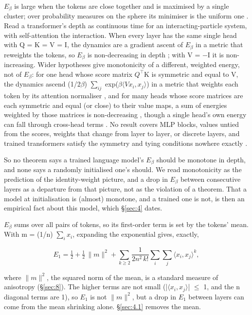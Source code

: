 \documentclass[11pt]{article}
\begin{document}
$E_\beta $ is large when the tokens are close together and is maximised by a single cluster; over probability measures on the sphere its minimiser is the uniform one \citep[Prop. 3.4]{geshkovski2023}. Read a transformer's depth as continuous time for an interacting-particle system, with self-attention the interaction. When every layer has the same single head with Q = K = V = I, the dynamics are a gradient ascent of $E_\beta $ in a metric that reweights the tokens, so $E_\beta $ is non-decreasing in depth \citep[\S{}3.2]{geshkovski2023}; with V = $-$I it is non-increasing. Wider hypotheses give monotonicity of a different, weighted energy, not of $E_\beta $: for one head whose score matrix $Q^{\top}$K is symmetric and equal to V, the dynamics ascend (1/2$\beta $) $\sum _{ij}$ exp($\beta \langle Vx_{i}, x_{j}\rangle $) in a metric that weights each token by its attention normaliser \citep[\S{}3.4.1]{geshkovski2023}, and for many heads whose score matrices are each symmetric and equal (or close) to their value maps, a sum of energies weighted by those matrices is non-decreasing \citep[Theorems 11--12]{pendharkar2026}, though a single head's own energy can fall through cross-head terms \citep[Theorem 17]{pendharkar2026}. No result covers MLP blocks, values untied from the scores, weights that change from layer to layer, or discrete layers, and trained transformers satisfy the symmetry and tying conditions nowhere exactly \citep[\S{}10]{pendharkar2026}.

So no theorem says a trained language model's $E_\beta $ should be monotone in depth, and none says a randomly initialised one's should. We read monotonicity as the prediction of the identity-weight picture, and a drop in $E_\beta $ between consecutive layers as a departure from that picture, not as the violation of a theorem. That a model at initialisation is (almost) monotone, and a trained one is not, is then an empirical fact about this model, which \S\ref{sec:4} dates.

$E_\beta $ sums over all pairs of tokens, so its first-order term is set by the tokens' mean. With m = (1/n) $\sum _{i} x_{i}$, expanding the exponential gives, exactly,

\begin{equation}
E_1 = \tfrac12 + \tfrac12\,\|m\|^2 + \sum_{k\ge 2}\frac{1}{2n^2\,k!}\sum_i\sum_j \langle x_i, x_j\rangle^k,
\end{equation}

where $\|m\|^{2}$, the squared norm of the mean, is a standard measure of anisotropy (\S\ref{sec:8}). The higher terms are not small (|$\langle x_{i}, x_{j}\rangle $| $\leq $ 1, and the n diagonal terms are 1), so $E_{1}$ is not $\|m\|^{2}$, but a drop in $E_{1}$ between layers can come from the mean shrinking alone. \S\ref{sec:4.1} removes the mean.
\end{document}

